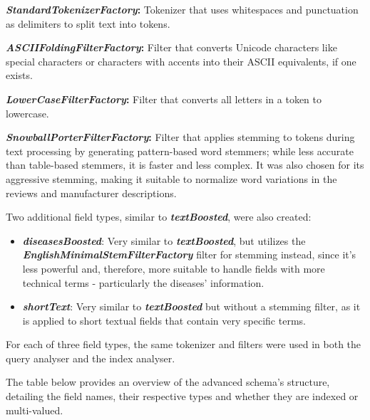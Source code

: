 \documentclass[sigconf]{acmart}
\begin{document}
\begin{arrowlist}
	\item \textbf{\textit{StandardTokenizerFactory}:} Tokenizer that uses whitespaces and punctuation as delimiters to split text into tokens.
        \item \textbf{\textit{ASCIIFoldingFilterFactory}:} Filter that 
    converts Unicode characters like special characters or characters with accents into their ASCII equivalents, if one exists.
	\item \textbf{\textit{LowerCaseFilterFactory}:} Filter that converts all letters in a token to lowercase.
	\item \textbf{\textit{SnowballPorterFilterFactory}:} Filter that applies stemming to tokens during text processing by generating pattern-based word stemmers; while less accurate than table-based stemmers, it is faster and less complex. It was also chosen for its aggressive stemming, making it suitable to normalize word variations in the reviews and manufacturer descriptions.
\end{arrowlist}

Two additional field types, similar to \textbf{\textit{textBoosted}}, were also created:

\begin{itemize}
        \item \textbf{\textit{diseasesBoosted}}: Very similar to 
    \textbf{\textit{textBoosted}}, but utilizes the \textbf{\textit{EnglishMinimalStemFilterFactory}} filter for stemming instead, since it's less powerful and, therefore, more suitable to handle fields with more technical terms - particularly the diseases' information.
	\item \textbf{\textit{shortText}}: Very similar to \textbf{\textit{textBoosted}} but without a stemming filter, as it is applied to short textual fields that contain very specific terms.
\end{itemize}

For each of three field types, the same tokenizer and filters were used in both the query analyser and the index analyser.

The table below provides an overview of the advanced schema's structure, detailing the field names, their respective types and whether they are indexed or multi-valued.
\end{document}
